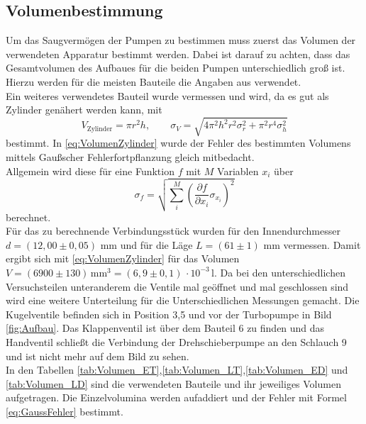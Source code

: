 \subsection{Volumenbestimmung}
Um das Saugvermögen der Pumpen zu bestimmen muss zuerst das Volumen der verwendeten Apparatur bestimmt werden. Dabei ist
darauf zu achten, dass das Gesamtvolumen des Aufbaues für die beiden Pumpen unterschiedlich groß ist.\\
Hierzu werden für die meisten Bauteile die Angaben aus \cite{Anleitung} verwendet.\\
Ein weiteres verwendetes Bauteil wurde vermessen und wird, da es gut als Zylinder genähert werden kann, mit
\begin{equation}
  V_{\text{Zylinder}}=\pi r^2 h, \qquad \sigma_{V}=\sqrt{4 \pi^{2} h^{2} r^{2} \sigma_{r}^{2}  + \pi^{2} r^{4} \sigma_{h}^{2} }
\label{eq:VolumenZylinder}
\end{equation}
bestimmt. In \ref{eq:VolumenZylinder} wurde der Fehler des bestimmten Volumens mittels Gaußscher Fehlerfortpflanzung gleich mitbedacht.\\
Allgemein wird diese für eine Funktion $f$ mit $M$ Variablen $x_i$ über
\begin{equation}
  \label{eq:GaussFehler}
  \sigma_f= \sqrt{ \sum_i^M \left(\frac{\partial f}{\partial x_i} \sigma_{x_i}\right)^2}
\end{equation}
berechnet.\\
Für das zu berechnende Verbindungsstück wurden für den Innendurchmesser $d=(12,00 \pm 0,05)$ mm und für die Läge $L=(61\pm 1)$ mm vermessen.
Damit ergibt sich mit \ref{eq:VolumenZylinder} für das Volumen $V=(6900 \pm 130)\,\text{mm}^3 = (6,9 \pm 0,1)\,\cdot 10^{-3}$\,l.
Da bei den unterschiedlichen Versuchsteilen unteranderem die Ventile mal geöffnet und mal geschlossen sind wird eine weitere Unterteilung
für die Unterschiedlichen Messungen gemacht. Die Kugelventile befinden sich in Position 3,5 und vor der Turbopumpe in Bild \ref{fig:Aufbau}.
Das Klappenventil ist über dem Bauteil 6 zu finden und das Handventil schließt die Verbindung der Drehschieberpumpe an den Schlauch 9 und ist nicht mehr
auf dem Bild zu sehen.\\
In den Tabellen \ref{tab:Volumen_ET},\ref{tab:Volumen_LT},\ref{tab:Volumen_ED} und \ref{tab:Volumen_LD} sind die verwendeten Bauteile
 und ihr jeweiliges Volumen aufgetragen.
Die Einzelvolumina werden aufaddiert und der Fehler mit Formel \ref{eq:GaussFehler} bestimmt.

